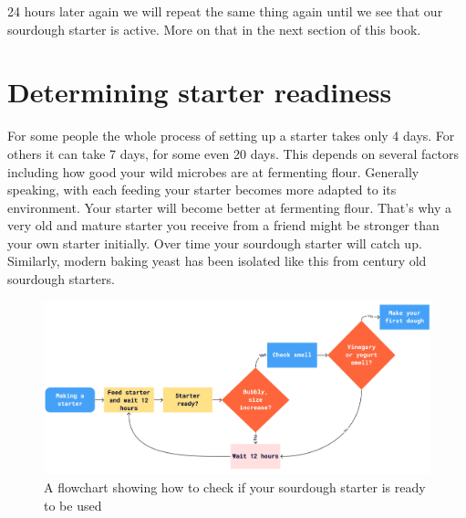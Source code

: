 24 hours later again we will repeat the same thing again until
we see that our sourdough starter is active. More on that in the
next section of this book.

\section{Determining starter readiness}

For some people the whole process of setting up a starter takes
only 4 days. For others it can take 7 days, for some even 20 days.
This depends on several factors including how good your wild microbes
are at fermenting flour. Generally speaking, with each feeding
your starter becomes more adapted to its environment. Your
starter will become better at fermenting flour. That's why
a very old and mature starter you receive from a friend might
be stronger than your own starter initially. Over time
your sourdough starter will catch up. Similarly, modern baking
yeast has been isolated like this from century old sourdough
starters.

\begin{figure}[!htb]
  \includegraphics[width=\textwidth]{sourdough-starter-readiness.jpg}
  \caption{A flowchart showing how to check if your sourdough starter is ready
  to be used}
  \label{fig:sourdough-starter-readiness}
\end{figure}

